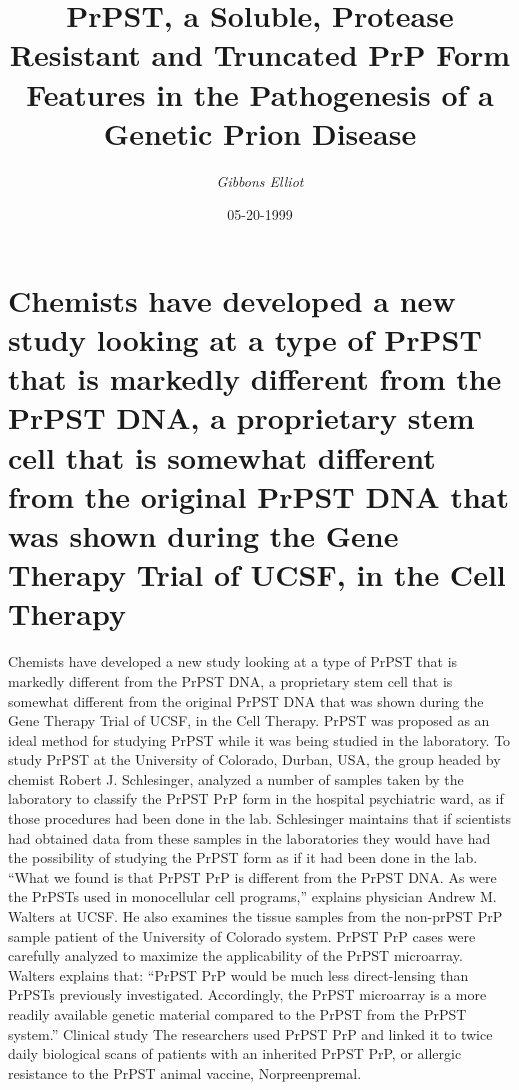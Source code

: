 \documentclass{article}%
\title{PrPST, a Soluble, Protease Resistant and Truncated PrP Form Features in the Pathogenesis of a Genetic Prion Disease}%
\author{\textit{Gibbons Elliot}}%
\date{05-20-1999}%
\begin{document}
%
\normalsize%
\maketitle%
\section{Chemists have developed a new study looking at a type of PrPST that is markedly different from the PrPST DNA, a proprietary stem cell that is somewhat different from the original PrPST DNA that was shown during the Gene Therapy Trial of UCSF, in the Cell Therapy}%
\label{sec:ChemistshavedevelopedanewstudylookingatatypeofPrPSTthatismarkedlydifferentfromthePrPSTDNA,aproprietarystemcellthatissomewhatdifferentfromtheoriginalPrPSTDNAthatwasshownduringtheGeneTherapyTrialofUCSF,intheCellTherapy}%
Chemists have developed a new study looking at a type of PrPST that is markedly different from the PrPST DNA, a proprietary stem cell that is somewhat different from the original PrPST DNA that was shown during the Gene Therapy Trial of UCSF, in the Cell Therapy. PrPST was proposed as an ideal method for studying PrPST while it was being studied in the laboratory. To study PrPST at the University of Colorado, Durban, USA, the group headed by chemist Robert J. Schlesinger, analyzed a number of samples taken by the laboratory to classify the PrPST PrP form in the hospital psychiatric ward, as if those procedures had been done in the lab. Schlesinger maintains that if scientists had obtained data from these samples in the laboratories they would have had the possibility of studying the PrPST form as if it had been done in the lab. “What we found is that PrPST PrP is different from the PrPST DNA. As were the PrPSTs used in monocellular cell programs,” explains physician Andrew M. Walters at UCSF. He also examines the tissue samples from the non{-}prPST PrP sample patient of the University of Colorado system. PrPST PrP cases were carefully analyzed to maximize the applicability of the PrPST microarray. Walters explains that: “PrPST PrP would be much less direct{-}lensing than PrPSTs previously investigated. Accordingly, the PrPST microarray is a more readily available genetic material compared to the PrPST from the PrPST system.”\newline%
Clinical study\newline%
The researchers used PrPST PrP and linked it to twice daily biological scans of patients with an inherited PrPST PrP, or allergic resistance to the PrPST animal vaccine, Norpreenpremal.\newline%
\end{document}
